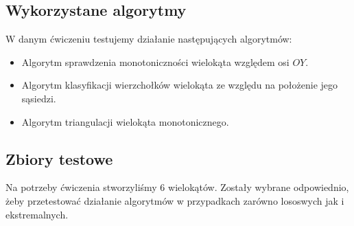 \subsection{Wykorzystane algorytmy}
\quad W danym ćwiczeniu testujemy działanie następujących algorytmów:
\begin{itemize}
    \item Algorytm sprawdzenia monotoniczności wielokąta względem osi $OY$.
    \item Algorytm klasyfikacji wierzchołków wielokąta ze względu na położenie jego sąsiedzi.
    \item Algorytm triangulacji wielokąta monotonicznego.
\end{itemize}
\subsection{Zbiory testowe}
\quad Na potrzeby ćwiczenia stworzyliśmy 6 wielokątów.
Zostały wybrane odpowiednio, żeby przetestować działanie algorytmów w przypadkach zarówno lososwych jak i ekstremalnych.